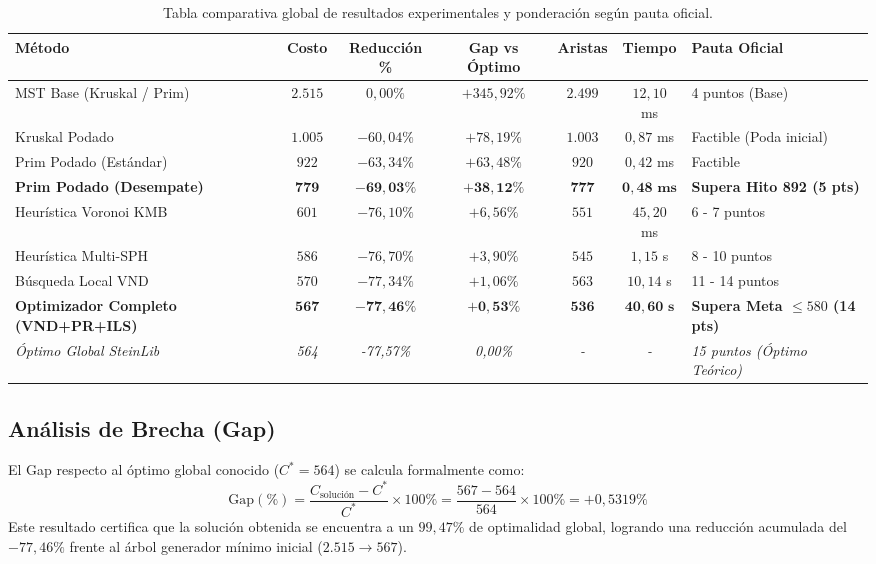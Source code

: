 \documentclass[11pt,a4paper]{article}
\begin{document}
\begin{table}[htbp]
\centering
\small
\caption{Tabla comparativa global de resultados experimentales y ponderación según pauta oficial.}
\label{tab:resumen_global}
\begin{tabularx}{\textwidth}{lcccccX}
\toprule
\textbf{Método} & \textbf{Costo} & \textbf{Reducción \%} & \textbf{Gap vs Óptimo} & \textbf{Aristas} & \textbf{Tiempo} & \textbf{Pauta Oficial} \\
\midrule
MST Base (Kruskal / Prim) & $2.515$ & $0,00\%$ & $+345,92\%$ & $2.499$ & $12,10$ ms & 4 puntos (Base) \\
Kruskal Podado & $1.005$ & $-60,04\%$ & $+78,19\%$ & $1.003$ & $0,87$ ms & Factible (Poda inicial) \\
Prim Podado (Estándar) & $922$ & $-63,34\%$ & $+63,48\%$ & $920$ & $0,42$ ms & Factible \\
\textbf{Prim Podado (Desempate)} & $\mathbf{779}$ & $\mathbf{-69,03\%}$ & $\mathbf{+38,12\%}$ & $\mathbf{777}$ & $\mathbf{0,48\text{ ms}}$ & \textbf{Supera Hito 892 (5 pts)} \\
Heurística Voronoi KMB & $601$ & $-76,10\%$ & $+6,56\%$ & $551$ & $45,20$ ms & 6 - 7 puntos \\
Heurística Multi-SPH & $586$ & $-76,70\%$ & $+3,90\%$ & $545$ & $1,15$ s & 8 - 10 puntos \\
Búsqueda Local VND & $570$ & $-77,34\%$ & $+1,06\%$ & $563$ & $10,14$ s & 11 - 14 puntos \\
\textbf{Optimizador Completo (VND+PR+ILS)} & $\mathbf{567}$ & $\mathbf{-77,46\%}$ & $\mathbf{+0,53\%}$ & $\mathbf{536}$ & $\mathbf{40,60\text{ s}}$ & \textbf{Supera Meta $\le 580$ (14 pts)} \\
\textit{Óptimo Global SteinLib} & \textit{564} & \textit{-77,57\%} & \textit{0,00\%} & \textit{-} & \textit{-} & \textit{15 puntos (Óptimo Teórico)} \\
\bottomrule
\end{tabularx}
\end{table}

\subsection{Análisis de Brecha (Gap)}
El Gap respecto al óptimo global conocido ($C^* = 564$) se calcula formalmente como:
\begin{equation}
    \text{Gap}(\%) = \frac{C_{\text{solución}} - C^*}{C^*} \times 100\% = \frac{567 - 564}{564} \times 100\% = +0,5319\%
\end{equation}
Este resultado certifica que la solución obtenida se encuentra a un $99,47\%$ de optimalidad global, logrando una reducción acumulada del $-77,46\%$ frente al árbol generador mínimo inicial ($2.515 \to 567$).
\end{document}
